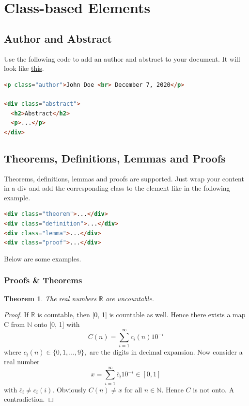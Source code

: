 \documentclass[
  11pt,
  a4paper,
]{article}
\newtheorem{thm}{Theorem}
\begin{document}
\section{Class-based Elements}\label{class-based-elements}

\subsection{Author and Abstract}\label{author-abstract}

Use the following code to add an author and abstract to your document.
It will look like \hyperref[top]{this}.

\begin{lstlisting}[language=HTML]
<p class="author">John Doe <br> December 7, 2020</p>

<div class="abstract">
  <h2>Abstract</h2>
  <p>...</p>
</div>
\end{lstlisting}

\subsection{Theorems, Definitions, Lemmas and Proofs}\label{tdpl}

Theorems, definitions, lemmas and proofs are supported. Just wrap your
content in a div and add the corresponding class to the element like in
the following example.

\begin{lstlisting}[language=HTML]
<div class="theorem">...</div>
<div class="definition">...</div>
<div class="lemma">...</div>
<div class="proof">...</div>
\end{lstlisting}

Below are some examples.

\subsubsection{Proofs \& Theorems}\label{proofs-theorems}

\begin{thm}

The real numbers \(\mathbb{R}\) are uncountable.

\end{thm}

\begin{proof}

If \(\mathbb{R}\) is countable, then {[}0, 1{]} is countable as well.
Hence there exists a map C from \(\mathbb{N}\) onto {[}0, 1{]} with
\[C(n)=\sum_{i=1}^{\infty} c_{i}(n) 10^{-i}\] where \(c_{i}(n)
        \in\{0,1, \ldots, 9\},\) are the digits in decimal expansion.
Now consider a real number \[x=\sum_{i=1}^{\infty} \bar{c}_{i} 10^{-i}
        \in[0,1]\] with \(\bar{c}_{i} \neq c_{i}(i)\). Obviously
\(C(n) \neq x\) for all \(n \in \mathbb{N} .\) Hence \(C\) is not onto.
A contradiction.

\end{proof}
\end{document}
